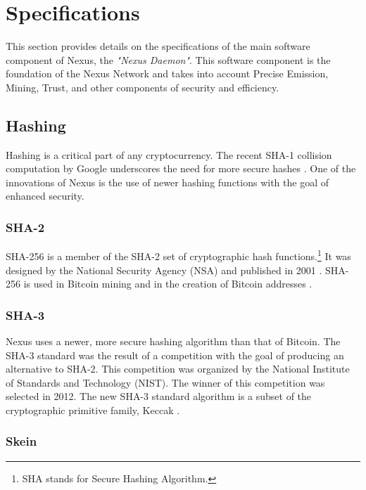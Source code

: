 \documentclass[11pt]{article}
\begin{document}
\section{Specifications}

This section provides details on the specifications of the main software component of Nexus, the \textit{"Nexus Daemon"}.
This software component is the foundation of the Nexus Network and takes into account Precise Emission, Mining, Trust, and other components of security and efficiency. 

\subsection{Hashing}

Hashing is a critical part of any cryptocurrency.
The recent SHA-1 collision computation by Google underscores the need for more secure hashes \cite{googlesha1}. 
One of the innovations of Nexus is the use of newer hashing functions with the goal of enhanced security.

\subsubsection{SHA-2}

SHA-256 is a member of the SHA-2 set of cryptographic hash functions.\footnote{SHA stands for Secure Hashing Algorithm.}
It was designed by the National Security Agency (NSA) and published in 2001 \cite{wikisha2}.
SHA-256 is used in Bitcoin mining and in the creation of Bitcoin addresses \cite{bitwiki256}.

\subsubsection{SHA-3}

Nexus uses a newer, more secure hashing algorithm than that of Bitcoin.
The SHA-3 \cite{sha3} standard was the result of a competition \cite{nistcompetitionend} with the goal of producing an alternative to SHA-2.
This competition was organized by the National Institute of Standards and Technology (NIST).
The winner of this competition was selected in 2012.
The new SHA-3 standard algorithm is a subset of the cryptographic primitive family, Keccak \cite{nistgovk}.

\subsubsection{Skein}
\end{document}
